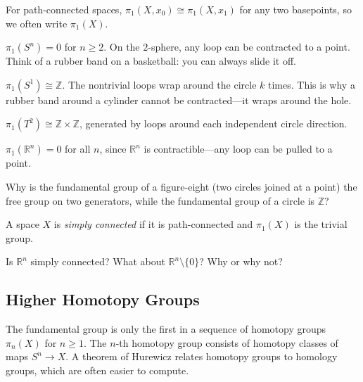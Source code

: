 For path-connected spaces, $\pi_1(X, x_0) \cong \pi_1(X, x_1)$ for any two basepoints, so we often write $\pi_1(X)$.

\begin{example}
$\pi_1(S^n) = 0$ for $n \ge 2$. On the $2$-sphere, any loop can be contracted to a point. Think of a rubber band on a basketball: you can always slide it off.
\end{example}

\begin{example}
$\pi_1(S^1) \cong \mathbb{Z}$. The nontrivial loops wrap around the circle $k$ times. This is why a rubber band around a cylinder cannot be contracted---it wraps around the hole.
\end{example}

\begin{example}
$\pi_1(T^2) \cong \mathbb{Z} \times \mathbb{Z}$, generated by loops around each independent circle direction.
\end{example}

\begin{example}
$\pi_1(\mathbb{R}^n) = 0$ for all $n$, since $\mathbb{R}^n$ is contractible---any loop can be pulled to a point.
\end{example}

\begin{checkyou}
Why is the fundamental group of a figure-eight (two circles joined at a point) the free group on two generators, while the fundamental group of a circle is $\mathbb{Z}$?
\end{checkyou}

\begin{definition}
A space $X$ is \textit{simply connected} if it is path-connected and $\pi_1(X)$ is the trivial group.
\end{definition}

\begin{checkyou}
Is $\mathbb{R}^n$ simply connected? What about $\mathbb{R}^n \setminus \{0\}$? Why or why not?
\end{checkyou}

\subsection{Higher Homotopy Groups}

The fundamental group is only the first in a sequence of homotopy groups $\pi_n(X)$ for $n \ge 1$. The $n$-th homotopy group consists of homotopy classes of maps $S^n \to X$. A theorem of Hurewicz relates homotopy groups to homology groups, which are often easier to compute.


